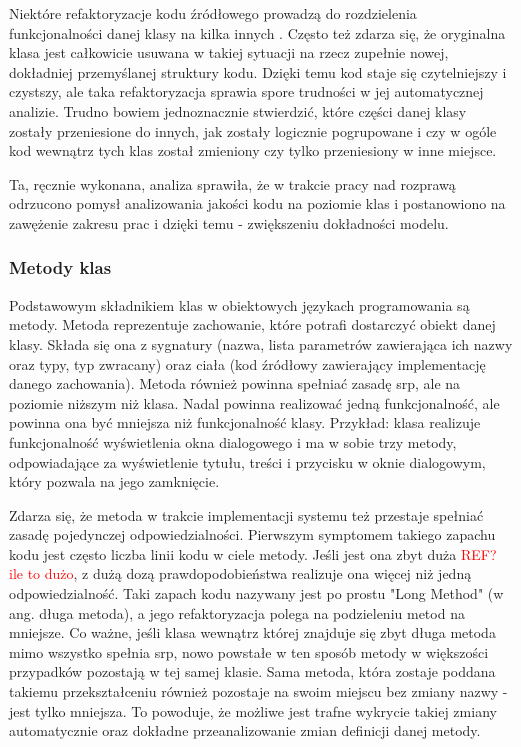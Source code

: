 \documentclass[12pt]{report}
\begin{document}
Niektóre refaktoryzacje kodu źródłowego prowadzą do rozdzielenia funkcjonalności danej klasy na kilka innych \cite{drozdz}. Często też zdarza się, że oryginalna klasa jest całkowicie usuwana w takiej sytuacji na rzecz zupełnie nowej, dokładniej przemyślanej struktury kodu. Dzięki temu kod staje się czytelniejszy i czystszy, ale taka refaktoryzacja sprawia spore trudności w jej automatycznej analizie. Trudno bowiem jednoznacznie stwierdzić, które części danej klasy zostały przeniesione do innych, jak zostały logicznie pogrupowane i czy w ogóle kod wewnątrz tych klas został zmieniony czy tylko przeniesiony w inne miejsce.

Ta, ręcznie wykonana, analiza sprawiła, że w trakcie pracy nad rozprawą odrzucono pomysł analizowania jakości kodu na poziomie klas i postanowiono na zawężenie zakresu prac i dzięki temu - zwiększeniu dokładności modelu.

\subsubsection{Metody klas}
Podstawowym składnikiem klas w obiektowych językach programowania są metody. Metoda reprezentuje zachowanie, które potrafi dostarczyć obiekt danej klasy. Składa się ona z sygnatury (nazwa, lista parametrów zawierająca ich nazwy oraz typy, typ zwracany) oraz ciała (kod źródłowy zawierający implementację danego zachowania). Metoda również powinna spełniać zasadę \gls{srp}, ale na poziomie niższym niż klasa. Nadal powinna realizować jedną funkcjonalność, ale powinna ona być mniejsza niż funkcjonalność klasy. Przykład: klasa realizuje funkcjonalność wyświetlenia okna dialogowego i ma w sobie trzy metody, odpowiadające za wyświetlenie tytułu, treści i przycisku w oknie dialogowym, który pozwala na jego zamknięcie.

Zdarza się, że metoda w trakcie implementacji systemu też przestaje spełniać zasadę pojedynczej odpowiedzialności. Pierwszym symptomem takiego zapachu kodu jest często liczba linii kodu w ciele metody. Jeśli jest ona zbyt duża \textcolor{red}{REF? ile to dużo}, z dużą dozą prawdopodobieństwa realizuje ona więcej niż jedną odpowiedzialność. Taki zapach kodu nazywany jest po prostu "Long Method" \cite{martin2009clean} (w ang. długa metoda), a jego refaktoryzacja polega na podzieleniu metod na mniejsze. Co ważne, jeśli klasa wewnątrz której znajduje się zbyt długa metoda mimo wszystko spełnia \gls{srp}, nowo powstałe w ten sposób metody w większości przypadków pozostają w tej samej klasie. Sama metoda, która zostaje poddana takiemu przekształceniu również pozostaje na swoim miejscu bez zmiany nazwy - jest tylko mniejsza. To powoduje, że możliwe jest trafne wykrycie takiej zmiany automatycznie oraz dokładne przeanalizowanie zmian definicji danej metody.
\end{document}
